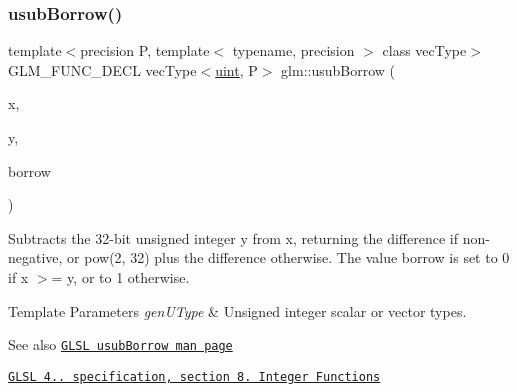 \subsubsection{\texorpdfstring{usub\+Borrow()}{usubBorrow()}}
{\footnotesize\ttfamily template$<$precision P, template$<$ typename, precision $>$ class vec\+Type$>$ \\
G\+L\+M\+\_\+\+F\+U\+N\+C\+\_\+\+D\+E\+CL vec\+Type$<$\hyperlink{group__core__precision_ga4fd29415871152bfb5abd588334147c8}{uint}, P$>$ glm\+::usub\+Borrow (\begin{DoxyParamCaption}\item[{vec\+Type$<$ \hyperlink{group__core__precision_ga4fd29415871152bfb5abd588334147c8}{uint}, P $>$ const \&}]{x,  }\item[{vec\+Type$<$ \hyperlink{group__core__precision_ga4fd29415871152bfb5abd588334147c8}{uint}, P $>$ const \&}]{y,  }\item[{vec\+Type$<$ \hyperlink{group__core__precision_ga4fd29415871152bfb5abd588334147c8}{uint}, P $>$ \&}]{borrow }\end{DoxyParamCaption})}

Subtracts the 32-\/bit unsigned integer y from x, returning the difference if non-\/negative, or pow(2, 32) plus the difference otherwise. The value borrow is set to 0 if x $>$= y, or to 1 otherwise.


\begin{DoxyTemplParams}{Template Parameters}
{\em gen\+U\+Type} & Unsigned integer scalar or vector types.\\
\hline
\end{DoxyTemplParams}
\begin{DoxySeeAlso}{See also}
\href{http://www.opengl.org/sdk/docs/manglsl/xhtml/usubBorrow.xml}{\tt G\+L\+SL usub\+Borrow man page} 

\href{http://www.opengl.org/registry/doc/GLSLangSpec.4.20.8.pdf}{\tt G\+L\+SL 4.. specification, section 8. Integer Functions} 
\end{DoxySeeAlso}
